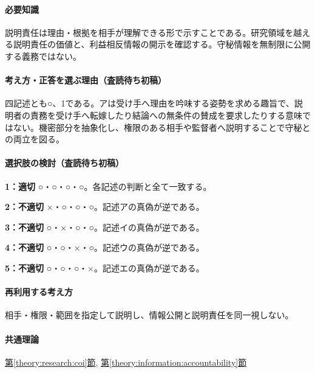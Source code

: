 \paragraph{必要知識} 説明責任は理由・根拠を相手が理解できる形で示すことである。研究領域を越える説明責任の価値と、利益相反情報の開示を確認する。守秘情報を無制限に公開する義務ではない。

\paragraph{考え方・正答を選ぶ理由（査読待ち初稿）} 四記述とも○、1である。アは受け手へ理由を吟味する姿勢を求める趣旨で、説明者の責務を受け手へ転嫁したり結論への無条件の賛成を要求したりする意味ではない。機密部分を抽象化し、権限のある相手や監督者へ説明することで守秘との両立を図る。

\paragraph{選択肢の検討（査読待ち初稿）}\mbox{}\par

\noindent\textbf{1：適切} ○・○・○・○。各記述の判断と全て一致する。\par

\noindent\textbf{2：不適切} ×・○・○・○。記述アの真偽が逆である。\par

\noindent\textbf{3：不適切} ○・×・○・○。記述イの真偽が逆である。\par

\noindent\textbf{4：不適切} ○・○・×・○。記述ウの真偽が逆である。\par

\noindent\textbf{5：不適切} ○・○・○・×。記述エの真偽が逆である。\par

\paragraph{再利用する考え方} 相手・権限・範囲を指定して説明し、情報公開と説明責任を同一視しない。

\paragraph{共通理論} \hyperref[theory:research:coi]{第\ref*{theory:research:coi}節}, \hyperref[theory:information:accountability]{第\ref*{theory:information:accountability}節}

